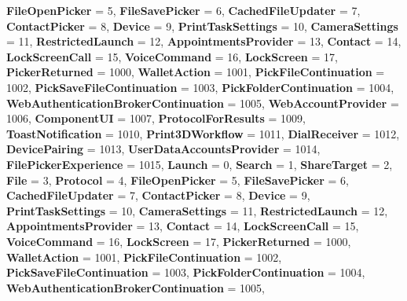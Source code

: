 \begin{DoxyCompactItemize}
{\bfseries File\+Open\+Picker} = 5, 
{\bfseries File\+Save\+Picker} = 6, 
{\bfseries Cached\+File\+Updater} = 7, 
{\bfseries Contact\+Picker} = 8, 
\newline
{\bfseries Device} = 9, 
{\bfseries Print\+Task\+Settings} = 10, 
{\bfseries Camera\+Settings} = 11, 
{\bfseries Restricted\+Launch} = 12, 
\newline
{\bfseries Appointments\+Provider} = 13, 
{\bfseries Contact} = 14, 
{\bfseries Lock\+Screen\+Call} = 15, 
{\bfseries Voice\+Command} = 16, 
\newline
{\bfseries Lock\+Screen} = 17, 
{\bfseries Picker\+Returned} = 1000, 
{\bfseries Wallet\+Action} = 1001, 
{\bfseries Pick\+File\+Continuation} = 1002, 
\newline
{\bfseries Pick\+Save\+File\+Continuation} = 1003, 
{\bfseries Pick\+Folder\+Continuation} = 1004, 
{\bfseries Web\+Authentication\+Broker\+Continuation} = 1005, 
{\bfseries Web\+Account\+Provider} = 1006, 
\newline
{\bfseries Component\+UI} = 1007, 
{\bfseries Protocol\+For\+Results} = 1009, 
{\bfseries Toast\+Notification} = 1010, 
{\bfseries Print3\+D\+Workflow} = 1011, 
\newline
{\bfseries Dial\+Receiver} = 1012, 
{\bfseries Device\+Pairing} = 1013, 
{\bfseries User\+Data\+Accounts\+Provider} = 1014, 
{\bfseries File\+Picker\+Experience} = 1015, 
\newline
{\bfseries Launch} = 0, 
{\bfseries Search} = 1, 
{\bfseries Share\+Target} = 2, 
{\bfseries File} = 3, 
\newline
{\bfseries Protocol} = 4, 
{\bfseries File\+Open\+Picker} = 5, 
{\bfseries File\+Save\+Picker} = 6, 
{\bfseries Cached\+File\+Updater} = 7, 
\newline
{\bfseries Contact\+Picker} = 8, 
{\bfseries Device} = 9, 
{\bfseries Print\+Task\+Settings} = 10, 
{\bfseries Camera\+Settings} = 11, 
\newline
{\bfseries Restricted\+Launch} = 12, 
{\bfseries Appointments\+Provider} = 13, 
{\bfseries Contact} = 14, 
{\bfseries Lock\+Screen\+Call} = 15, 
\newline
{\bfseries Voice\+Command} = 16, 
{\bfseries Lock\+Screen} = 17, 
{\bfseries Picker\+Returned} = 1000, 
{\bfseries Wallet\+Action} = 1001, 
\newline
{\bfseries Pick\+File\+Continuation} = 1002, 
{\bfseries Pick\+Save\+File\+Continuation} = 1003, 
{\bfseries Pick\+Folder\+Continuation} = 1004, 
{\bfseries Web\+Authentication\+Broker\+Continuation} = 1005, 
\newline

\end{DoxyCompactItemize}
